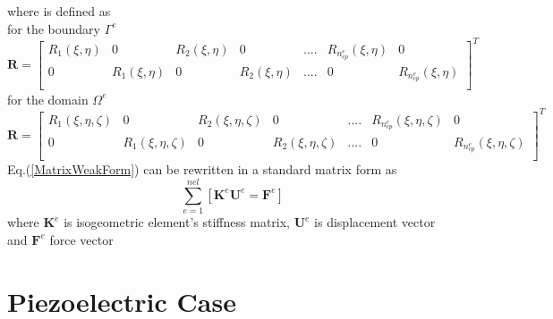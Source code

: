 \documentclass[12pt]{article}
\begin{document}
where  is defined as \\
for the boundary $\Gamma^e$ 
\begin{equation} \label{RMatrix1}
\textbf{R} =
\begin{bmatrix}
R_1(\xi,\eta) & 0 & R_2(\xi,\eta) &0 & .... & R_{n_{cp}^e}(\xi,\eta) & 0 \\
0 &R_1(\xi,\eta) & 0 & R_2(\xi,\eta) & .... & 0 & R_{n_{cp}^e}(\xi,\eta) \\
\end{bmatrix}^T
\end{equation}
for the domain $\Omega^e$
\begin{equation} \label{RMatrix2}
\textbf{R} =
\begin{bmatrix}
R_1(\xi,\eta,\zeta) & 0 & R_2(\xi,\eta,\zeta) &0 & .... & R_{n_{cp}^e}(\xi,\eta,\zeta) & 0 \\
0 &R_1(\xi,\eta,\zeta) & 0 & R_2(\xi,\eta,\zeta) & .... & 0 & R_{n_{cp}^e}(\xi,\eta,\zeta) \\
\end{bmatrix}^T
\end{equation}
Eq.(\ref{MatrixWeakForm}) can be rewritten in a standard matrix form as
\begin{equation}
\sum_{e=1}^{nel} [\textbf{K}^e \textbf{U}^e = \textbf{F}^e] 
\end{equation}
where $\textbf{K}^e$ is isogeometric element’s stiffness matrix, $\textbf{U}^e$ is displacement vector and $\textbf{F}^e$ force vector





\section{Piezoelectric Case}
\end{document}
